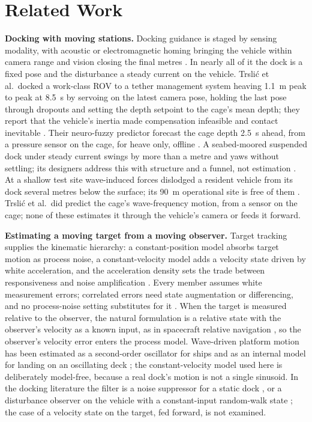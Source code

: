 \section{Related Work}
\label{sec:related}

\textbf{Docking with moving stations.} Docking guidance is staged by sensing modality, with acoustic or electromagnetic homing bringing the vehicle within camera range and vision closing the final metres \cite{yazdani2020survey,maire2009vision}. In nearly all of it the dock is a fixed pose and the disturbance a steady current on the vehicle. Trsli\'c et al.\ docked a work-class ROV to a tether management system heaving 1.1~m peak to peak at 8.5~s by servoing on the latest camera pose, holding the last pose through dropouts and setting the depth setpoint to the cage's mean depth; they report that the vehicle's inertia made compensation infeasible and contact inevitable \cite{trslic2020vision}. Their neuro-fuzzy predictor forecast the cage depth 2.5~s ahead, from a pressure sensor on the cage, for heave only, offline \cite{trslic2020neuro}. A seabed-moored suspended dock under steady current swings by more than a metre and yaws without settling; its designers address this with structure and a funnel, not estimation \cite{guo2024dynamic}. At a shallow test site wave-induced forces dislodged a resident vehicle from its dock several metres below the surface; its 90~m operational site is free of them \cite{gunzel2026docking}. Trsli\'c et al.\ did predict the cage's wave-frequency motion, from a sensor on the cage; none of these estimates it through the vehicle's camera or feeds it forward.

\textbf{Estimating a moving target from a moving observer.} Target tracking supplies the kinematic hierarchy: a constant-position model absorbs target motion as process noise, a constant-velocity model adds a velocity state driven by white acceleration, and the acceleration density sets the trade between responsiveness and noise amplification \cite{barshalom2001estimation}. Every member assumes white measurement errors; correlated errors need state augmentation or differencing, and no process-noise setting substitutes for it \cite{bryson1968correlated}. When the target is measured relative to the observer, the natural formulation is a relative state with the observer's velocity as a known input, as in spacecraft relative navigation \cite{kim2007relative}, so the observer's velocity error enters the process model. Wave-driven platform motion has been estimated as a second-order oscillator for ships \cite{triantafyllou1983ship} and as an internal model for landing on an oscillating deck \cite{marconi2002landing}; the constant-velocity model used here is deliberately model-free, because a real dock's motion is not a single sinusoid. In the docking literature the filter is a noise suppressor for a static dock \cite{gunzel2026docking,ni2025vision}, or a disturbance observer on the vehicle with a constant-input random-walk state \cite{shi2023integrated}; the case of a velocity state on the target, fed forward, is not examined.

